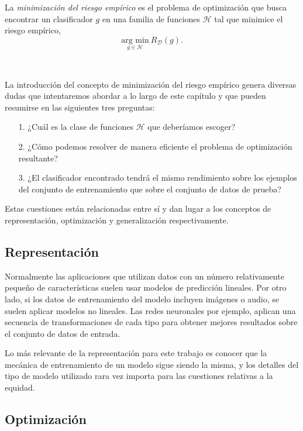 \documentclass[oneside,openright,titlepage,numbers=noenddot,openany,headinclude,footinclude=true,
cleardoublepage=empty,abstractoff,BCOR=5mm,paper=a4,fontsize=12pt,main=spanish]{scrreprt}
\begin{document}
\begin{definition} \label{def:minrisk}
La \textit{minimización del riesgo empírico} es el problema de optimización que busca encontrar un clasificador $g$ en una familia de funciones $\mathcal{H}$ tal que minimice el riesgo empírico, $$\underset{g\in \mathcal{H}}{\text{arg min}} \  R_{\mathcal{D}}(g).$$
\end{definition}\

La introducción del concepto de minimización del riesgo empírico genera diversas dudas que intentaremos abordar a lo largo de este capítulo y que pueden resumirse en las siguientes tres preguntas:

\begin{itemize}
    \item[1.] ¿Cuál es la clase de funciones $\mathcal{H}$ que deberíamos escoger?
    \item[2.] ¿Cómo podemos resolver de manera eficiente el problema de optimización resultante?
    \item[3.] ¿El clasificador encontrado tendrá el mismo rendimiento sobre los ejemplos del conjunto de entrenamiento que sobre el conjunto de datos de prueba?
\end{itemize}

Estas cuestiones están relacionadas entre sí y dan lugar a los conceptos de representación, optimización y generalización respectivamente.

\subsection{Representación}

Normalmente las aplicaciones que utilizan datos con un número relativamente pequeño de características suelen usar modelos de predicción lineales. Por otro lado, si los datos de entrenamiento del modelo incluyen imágenes o audio, se suelen aplicar modelos no lineales. Las redes neuronales por ejemplo, aplican una secuencia de transformaciones de cada tipo para obtener mejores resultados sobre el conjunto de datos de entrada.

Lo más relevante de la representación para este trabajo es conocer que la mecánica de entrenamiento de un modelo sigue siendo la misma, y los detalles del tipo de modelo utilizado rara vez importa para las cuestiones relativas a la equidad.


\subsection{Optimización}
\end{document}
